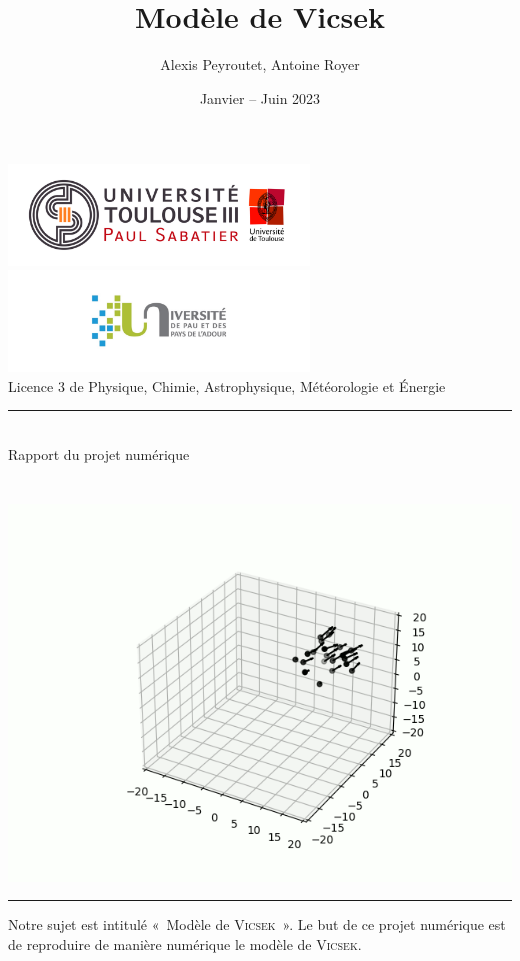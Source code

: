 \documentclass[french, a4paper, 12pt, openany]{report}
\title{\sc Modèle de Vicsek}
\author{Alexis {\sc Peyroutet}, Antoine {\sc Royer}}
\date{Janvier – Juin 2023}
\begin{document}
\makeatletter
\begin{titlepage}
	\centering
	
	\includegraphics[width=8cm]{images/ut3.png} \hfill \includegraphics[width=8cm]{images/uppa.png} \\
	{\large{\sc Licence 3 de Physique, Chimie, Astrophysique, Météorologie et Énergie}} \\
	\rule{0.5\linewidth}{0.4pt} \\
	{\sc Rapport du projet numérique} \\
	
	
	\vfill
	{\huge {\sc \@title}} \\ \vspace{1cm}
	{\Large \@author} \\
	
	\vfill 
	\includegraphics[width=0.7\linewidth]{images/page_garde.png}
	\vfill
	{\Large \@date}
	\rule{\linewidth}{0.4pt}
\end{titlepage}
\makeatother

\tableofcontents



	Notre sujet est intitulé «~Modèle de \textsc{Vicsek}~». Le but de ce projet numérique est de reproduire de manière numérique le modèle de \textsc{Vicsek}.
\end{document}

